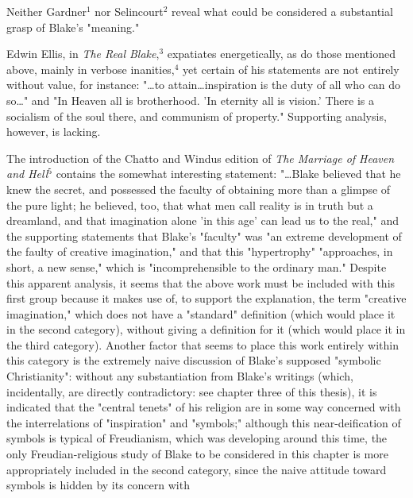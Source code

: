 \newpage

{}

Neither Gardner$^{1}$ nor Selincourt$^{2}$ reveal what could be 
considered a substantial grasp of Blake's "meaning."\par
\vspace*{0.5\baselineskip}
Edwin Ellis, in \textit{The Real Blake},$^{3}$ expatiates energetically, as
do those mentioned above, mainly in verbose inanities,$^{4}$ yet certain of his statements
are not entirely without value, for instance: "\dots to attain\dots inspiration is
the duty of all who can do so\dots" and "In Heaven all is brotherhood. 'In eternity all is vision.' There is
a socialism of the soul there, and communism of property." Supporting analysis, however, is lacking.\par
\vspace*{0.5\baselineskip}
The introduction of the Chatto and Windus edition of
\textit{The Marriage of Heaven and Hell}$^{5}$ contains the somewhat
interesting statement: "\dots Blake believed that he knew the
secret, and possessed the faculty of obtaining more than a glimpse of the pure light; he believed, too, that
what men call reality is in truth but a dreamland, and that imagination alone 'in this age' can lead us to the real," and
the supporting statements that Blake's "faculty" was "an extreme development of the 
faulty of creative imagination," and that this "hypertrophy" "approaches, in short, a new sense," which is
"incomprehensible to the ordinary man." Despite this apparent analysis, it seems that the above work must 
be included with this first group because it makes use of, to support the explanation, the
term "creative imagination," which does not have a "standard" definition (which would
place it in the second category), without giving a definition for it (which would place it in the
third category). Another factor that seems to place this work entirely within
this category is the extremely naive discussion of Blake's supposed "symbolic Christianity": without
any substantiation from Blake's writings (which, incidentally, are directly contradictory: see chapter three of this thesis),
it is indicated that the "central tenets" of his religion are in some way concerned with the interrelations
of "inspiration" and "symbols;" although this near-deification of symbols is typical of Freudianism, which
was developing around this time, the only Freudian-religious study of Blake to be considered in this chapter is more
appropriately included in the second category, since the naive attitude toward symbols is hidden by its concern with
